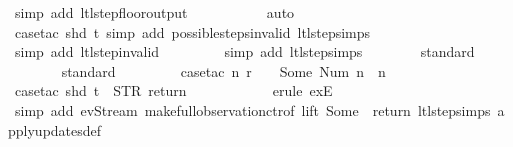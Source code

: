 \begin{isabellebody}
\ {\isacharparenleft}simp\ add{\isacharcolon}\ ltl{\isacharunderscore}step{\isacharunderscore}floor{\isacharunderscore}output{\isacharparenright}\isanewline
\ \ \ \ \ \ \ \ \ \isamarkupfalse%
\ auto{\isacharbrackleft}{}{\isacharbrackright}\isanewline
\ \ \ \ \ \ \ \ \isamarkupfalse%
\ {\isacharparenleft}case{\isacharunderscore}tac\ {\isachardoublequoteopen}shd\ t{\isachardoublequoteclose}{\isacharcomma}\ simp\ add{\isacharcolon}\ possible{\isacharunderscore}steps{\isacharunderscore}{}{\isacharunderscore}invalid\ ltl{\isacharunderscore}step{\isachardot}simps{\isacharparenright}\isanewline
\ \ \ \ \ \ \ \isamarkupfalse%
\ {\isacharparenleft}simp\ add{\isacharcolon}\ ltl{\isacharunderscore}step{\isacharunderscore}{}{\isacharunderscore}invalid{\isacharparenright}\isanewline
\ \ \ \ \ \ \ \isamarkupfalse%
\ {\isacharparenleft}simp\ add{\isacharcolon}\ ltl{\isacharunderscore}step{\isachardot}simps{\isacharparenright}\isanewline
\ \ \ \ \ \ \isamarkupfalse%
\ standard\isanewline
\ \ \ \ \ \ \isamarkupfalse%
\ standard\isanewline
\isanewline
\ \ \ \ \ \ \ \isamarkupfalse%
\ {\isacharparenleft}case{\isacharunderscore}tac\ {\isachardoublequoteopen}{\isasymexists}n{\isachardot}\ r\ {\isachardollar}\ {}\ {\isacharequal}\ Some\ {\isacharparenleft}Num\ n{\isacharparenright}\ {\isasymand}\ n\ {\isasymin}\ {\isacharbraceleft}{}{\isacharcomma}\ {}{\isacharcomma}\ {}{\isacharcomma}\ {}{\isacharbraceright}{\isachardoublequoteclose}{\isacharparenright}\isanewline
\ \ \ \ \ \ \ \ \isamarkupfalse%
\ {\isacharparenleft}case{\isacharunderscore}tac\ {\isachardoublequoteopen}shd\ t\ {\isacharequal}\ {\isacharparenleft}STR\ {\isacharprime}{\isacharprime}return{\isacharprime}{\isacharprime}{\isacharcomma}\ {\isacharbrackleft}{\isacharbrackright}{\isacharparenright}{\isachardoublequoteclose}{\isacharparenright}\isanewline
\ \ \ \ \ \ \ \ \ \isamarkupfalse%
\ {\isacharparenleft}erule\ exE{\isacharparenright}\isanewline
\ \ \ \ \ \ \ \ \ \isamarkupfalse%
\ {\isacharparenleft}simp\ add{\isacharcolon}\ ev{\isacharunderscore}Stream\ make{\isacharunderscore}full{\isacharunderscore}observation{\isachardot}ctr{\isacharbrackleft}of\ lift\ {\isachardoublequoteopen}Some\ {}{\isachardoublequoteclose}{\isacharbrackright}\ return\ ltl{\isacharunderscore}step{\isachardot}simps\ apply{\isacharunderscore}updates{\isacharunderscore}def{\isacharparenright}\isanewline

\end{isabellebody}
